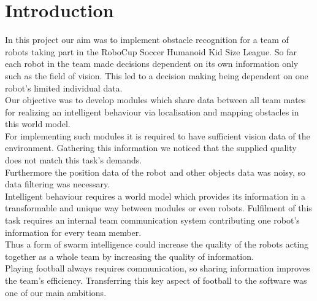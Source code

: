 \documentclass[lnicst,a4paper]{svmultln}
\begin{document}

\section{Introduction}

In this project our aim was to implement obstacle recognition for a team of robots taking part in the RoboCup Soccer Humanoid Kid Size League. So far each robot in the team made decisions dependent on its own information only such as the field of vision. This led to a decision making being dependent on one robot's limited individual data.
\\
Our objective was to develop modules which share data between all team mates for realizing an intelligent behaviour via localisation and mapping obstacles in this world model.
\\
For implementing such modules it is required to have sufficient vision data of the environment. Gathering this information we noticed that the supplied quality does not match this task's demands.
\\
Furthermore the position data of the robot and other objects data was noisy, so data filtering was necessary.
\\
Intelligent behaviour requires a world model which provides its information in a transformable and unique way between modules or even robots. Fulfilment of this task requires an internal team communication system contributing one robot's information for every team member.
\\
Thus a form of swarm intelligence could increase the quality of the robots acting together as a whole team by increasing the quality of information.
\\
Playing football always requires communication, so sharing information improves the team's efficiency. Transferring this key aspect of football to the software was one of our main ambitions.
\end{document}
